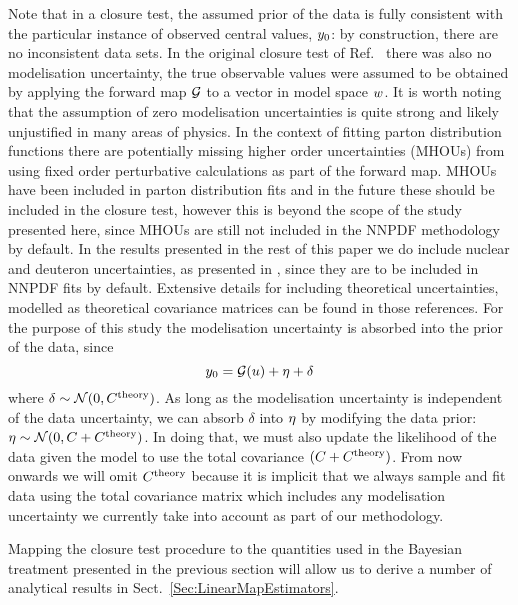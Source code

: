 Note that in a closure test, the assumed prior of the data is fully consistent
with the particular instance of observed central values, $y_0$: by
construction, there are no inconsistent data sets. In the original closure test
of Ref.~\cite{nnpdf30} there was also no modelisation uncertainty, the true observable
values were assumed to be obtained by applying the forward map $\mathcal{G}$ to a
vector in model space $w$. It is worth noting that the assumption of
zero modelisation uncertainties is quite strong and likely unjustified in many
areas of physics. In the context of fitting parton distribution functions there
are potentially missing higher order uncertainties (MHOUs) from using fixed
order perturbative calculations as part of the forward map. MHOUs have been
included in parton distribution fits \cite{NNPDF:2019vjt, AbdulKhalek:2019ihb} and in the
future these should be included in the closure test, however this is beyond the
scope of the study presented here, since MHOUs are still not included in the
NNPDF methodology by default. In the results presented in the rest of this paper
we do include nuclear and deuteron uncertainties, as presented in
\cite{Ball:2018twp, Ball:2020xqw}, since they are to be included in NNPDF fits
by default. Extensive details for including theoretical uncertainties, modelled
as theoretical covariance matrices can be found in those references. For the
purpose of this study the modelisation uncertainty is absorbed into the prior of
the data, since
\begin{equation}
    y_0 = \mathcal{G}(u) + \eta + \delta
\end{equation}
where $\delta \sim \mathcal{N}(0, C^{\rm theory})$. As long as the
modelisation uncertainty is independent of the data uncertainty, we can absorb
$\delta$ into $\eta$ by modifying the data prior: $\eta \sim
\mathcal{N}(0, C + C^{\rm theory})$. In doing that, we must also update the
likelihood of the data given the model to use the total covariance $(C + C^{\rm
theory})$. From now onwards we will omit $C^{\rm theory}$ because it is implicit
that we always sample and fit data using the total covariance matrix which
includes any modelisation uncertainty we currently take into account as part of
our methodology.

Mapping the closure test procedure to the quantities used in the Bayesian
treatment presented in the previous section will allow us to derive a number of
analytical results in Sect.~\ref{Sec:LinearMapEstimators}.